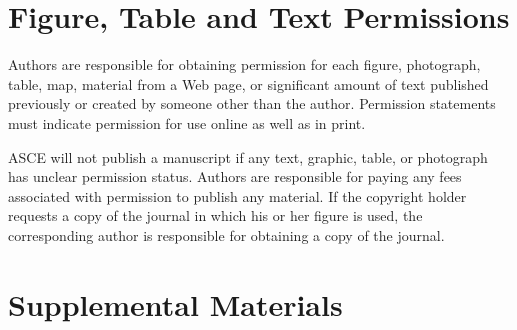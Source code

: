 \documentclass[Journal,LineNumbers]{ascelike-new}
\begin{document}
\begin{table}

\caption{\label{tbl-assembly}An example table}


\end{table}%

\section{Figure, Table and Text
Permissions}\label{figure-table-and-text-permissions}

Authors are responsible for obtaining permission for each figure,
photograph, table, map, material from a Web page, or significant amount
of text published previously or created by someone other than the
author. Permission statements must indicate permission for use online as
well as in print.

ASCE will not publish a manuscript if any text, graphic, table, or
photograph has unclear permission status. Authors are responsible for
paying any fees associated with permission to publish any material. If
the copyright holder requests a copy of the journal in which his or her
figure is used, the corresponding author is responsible for obtaining a
copy of the journal.

\section{Supplemental Materials}\label{supplemental-materials}
\end{document}
